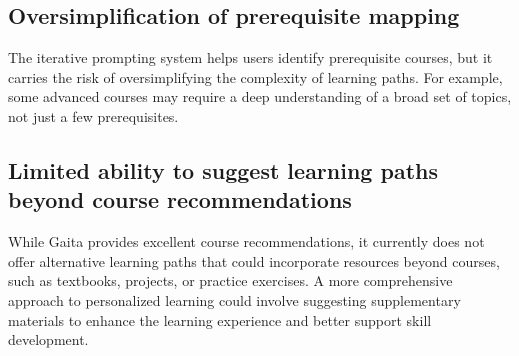 \subsection{Oversimplification of prerequisite mapping}

The iterative prompting system helps users identify prerequisite courses, but it carries the risk of oversimplifying the complexity of learning paths. For example, some advanced courses may require a deep understanding of a broad set of topics, not just a few prerequisites. 

\subsection{Limited ability to suggest learning paths beyond course recommendations}

While Gaita provides excellent course recommendations, it currently does not offer alternative learning paths that could incorporate resources beyond courses, such as textbooks, projects, or practice exercises. A more comprehensive approach to personalized learning could involve suggesting supplementary materials to enhance the learning experience and better support skill development.







